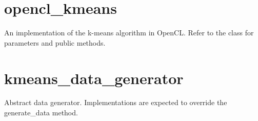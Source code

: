 \documentclass[letterpaper,10pt,english]{sphinxmanual}
\begin{document}
\section{opencl\_kmeans}
\label{kmeans:opencl-kmeans}

\begin{fulllineitems}
\label{kmeans:extension.c_kmeans.opencl.opencl_kmeans.OpenCLKmeans}
An implementation of the k-means algorithm in OpenCL. Refer to the {\hyperref[kmeans:kmeans.DefaultKmeans]{}} class for parameters and
public methods.

\end{fulllineitems}



\section{kmeans\_data\_generator}
\label{kmeans:module-kmeans_data_generator}\label{kmeans:kmeans-data-generator}

\begin{fulllineitems}
\label{kmeans:kmeans_data_generator.KmeansDataGenerator}
Abstract data generator. Implementations are expected to override the generate\_data method.

\end{fulllineitems}

\end{document}
